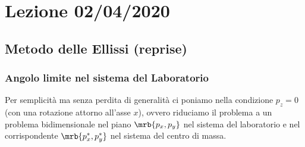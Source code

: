 \chapter{Lezione 02/04/2020}
\section{Metodo delle Ellissi (reprise)}
\subsection{Angolo limite nel sistema del Laboratorio}
Per semplicità ma senza perdita di generalità ci poniamo nella condizione $p_z
	= 0$ (con una rotazione attorno all'asse $x$), ovvero riduciamo il problema a
un problema bidimensionale nel piano $\mrb{p_x,p_y}$ nel sistema del
laboratorio e nel corrispondente $\mrb{p_x^\ast,p_y^\ast}$ nel sistema del centro di
massa.


